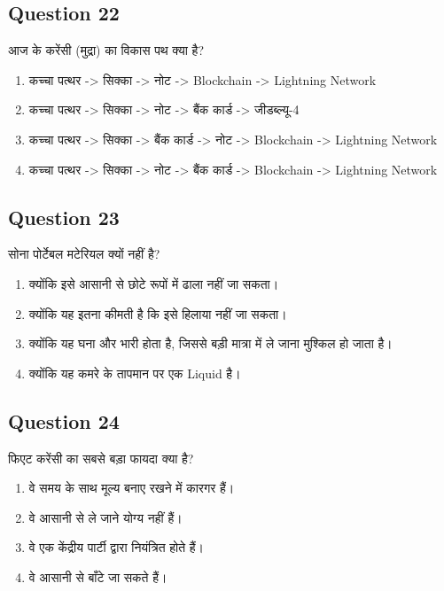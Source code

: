 \documentclass[12pt,a4paper]{article}
\begin{document}
\bigskip


\subsection*{Question 22}
आज के करेंसी (मुद्रा) का विकास पथ क्या है?

\begin{enumerate}[label=\Alph*., leftmargin=*]
\item कच्चा पत्थर -> सिक्का -> नोट -> Blockchain -> Lightning Network
\item कच्चा पत्थर -> सिक्का -> नोट -> बैंक कार्ड -> जीडब्ल्यू-4
\item कच्चा पत्थर -> सिक्का -> बैंक कार्ड -> नोट -> Blockchain -> Lightning Network
\item कच्चा पत्थर -> सिक्का -> नोट -> बैंक कार्ड -> Blockchain -> Lightning Network
\end{enumerate}

\bigskip


\subsection*{Question 23}
सोना पोर्टेबल मटेरियल क्यों नहीं है?

\begin{enumerate}[label=\Alph*., leftmargin=*]
\item क्योंकि इसे आसानी से छोटे रूपों में ढाला नहीं जा सकता।
\item क्योंकि यह इतना कीमती है कि इसे हिलाया नहीं जा सकता।
\item क्योंकि यह घना और भारी होता है, जिससे बड़ी मात्रा में ले जाना मुश्किल हो जाता है।
\item क्योंकि यह कमरे के तापमान पर एक Liquid है।
\end{enumerate}

\bigskip


\subsection*{Question 24}
फिएट करेंसी का सबसे बड़ा फायदा क्या है?

\begin{enumerate}[label=\Alph*., leftmargin=*]
\item वे समय के साथ मूल्य बनाए रखने में कारगर हैं।
\item वे आसानी से ले जाने योग्य नहीं हैं।
\item वे एक केंद्रीय पार्टी द्वारा नियंत्रित होते हैं।
\item वे आसानी से बाँटे जा सकते हैं।
\end{enumerate}
\end{document}
